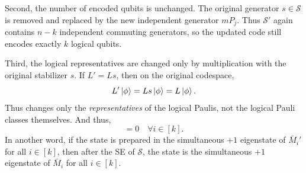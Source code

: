 Second, the number of encoded qubits is unchanged. The original generator $s \in \mathcal{S}$ is
removed and replaced by the new independent generator $m P_j$. Thus
$\mathcal{S}'$ again contains $n-k$ independent commuting generators, so the
updated code still encodes exactly $k$ logical qubits.

Third, the logical representatives are changed only by multiplication with the original
stabilizer $s$. If $L' = L s$, then on the original codespace,
\begin{equation}
L' \ket{\phi} = L s \ket{\phi} = L \ket{\phi} .
\label{eq:tomas-step-same-logical-action}
\end{equation}
Thus  changes only the
\emph{representatives} of the logical Paulis, not the logical Pauli classes
themselves.
And thus, 
\begin{equation}
[\bar{M}_i', \proj_{\mathcal{S}}] = 0 \quad \forall i \in [k].
\end{equation}
In another word, if the state is prepared in the simultaneous $ +1 $ eigenstate of $ \bar{M}_i' $ for all $ i \in [k] $,
then after the SE of $\mathcal{S}$, the state is the simultaneous $ +1 $ eigenstate of $ \bar{M}_i $ for all $ i \in [k] $.
